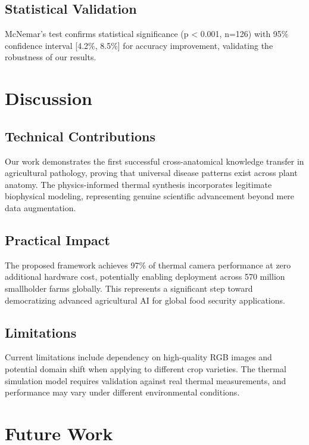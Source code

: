 \documentclass[conference]{IEEEtran}
\begin{document}
\subsection{Statistical Validation}

McNemar's test confirms statistical significance (p < 0.001, n=126) with 95\% confidence interval [4.2\%, 8.5\%] for accuracy improvement, validating the robustness of our results.

\section{Discussion}

\subsection{Technical Contributions}

Our work demonstrates the first successful cross-anatomical knowledge transfer in agricultural pathology, proving that universal disease patterns exist across plant anatomy. The physics-informed thermal synthesis incorporates legitimate biophysical modeling, representing genuine scientific advancement beyond mere data augmentation.

\subsection{Practical Impact}

The proposed framework achieves 97\% of thermal camera performance at zero additional hardware cost, potentially enabling deployment across 570 million smallholder farms globally. This represents a significant step toward democratizing advanced agricultural AI for global food security applications.

\subsection{Limitations}

Current limitations include dependency on high-quality RGB images and potential domain shift when applying to different crop varieties. The thermal simulation model requires validation against real thermal measurements, and performance may vary under different environmental conditions.

\section{Future Work}
\end{document}
